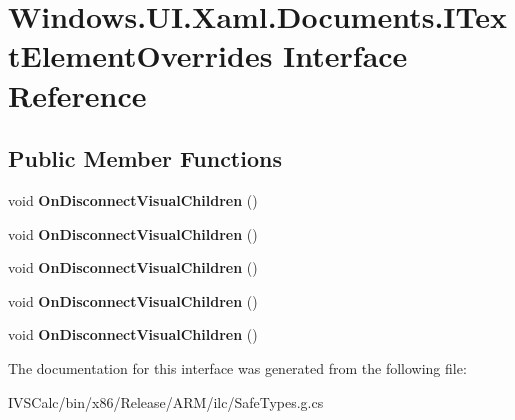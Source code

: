 \hypertarget{interface_windows_1_1_u_i_1_1_xaml_1_1_documents_1_1_i_text_element_overrides}{}\section{Windows.\+U\+I.\+Xaml.\+Documents.\+I\+Text\+Element\+Overrides Interface Reference}
\label{interface_windows_1_1_u_i_1_1_xaml_1_1_documents_1_1_i_text_element_overrides}
\subsection*{Public Member Functions}
\begin{DoxyCompactItemize}
\item 
\mbox{\label{interface_windows_1_1_u_i_1_1_xaml_1_1_documents_1_1_i_text_element_overrides_a31371f9922e5d7f308c035a26666e302}} 
void {\bfseries On\+Disconnect\+Visual\+Children} ()
\item 
\mbox{\label{interface_windows_1_1_u_i_1_1_xaml_1_1_documents_1_1_i_text_element_overrides_a31371f9922e5d7f308c035a26666e302}} 
void {\bfseries On\+Disconnect\+Visual\+Children} ()
\item 
\mbox{\label{interface_windows_1_1_u_i_1_1_xaml_1_1_documents_1_1_i_text_element_overrides_a31371f9922e5d7f308c035a26666e302}} 
void {\bfseries On\+Disconnect\+Visual\+Children} ()
\item 
\mbox{\label{interface_windows_1_1_u_i_1_1_xaml_1_1_documents_1_1_i_text_element_overrides_a31371f9922e5d7f308c035a26666e302}} 
void {\bfseries On\+Disconnect\+Visual\+Children} ()
\item 
\mbox{\label{interface_windows_1_1_u_i_1_1_xaml_1_1_documents_1_1_i_text_element_overrides_a31371f9922e5d7f308c035a26666e302}} 
void {\bfseries On\+Disconnect\+Visual\+Children} ()
\end{DoxyCompactItemize}


The documentation for this interface was generated from the following file\+:\begin{DoxyCompactItemize}
\item 
I\+V\+S\+Calc/bin/x86/\+Release/\+A\+R\+M/ilc/Safe\+Types.\+g.\+cs\end{DoxyCompactItemize}
